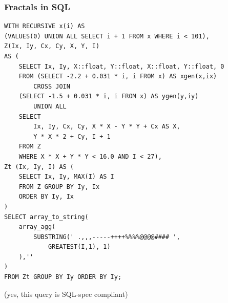 \documentclass{beamer}
\begin{document}
\begin{frame}[fragile]
    \frametitle{Fractals in SQL}
    \tiny
    \begin{verbatim}
WITH RECURSIVE x(i) AS
(VALUES(0) UNION ALL SELECT i + 1 FROM x WHERE i < 101),
Z(Ix, Iy, Cx, Cy, X, Y, I)
AS (
    SELECT Ix, Iy, X::float, Y::float, X::float, Y::float, 0
    FROM (SELECT -2.2 + 0.031 * i, i FROM x) AS xgen(x,ix)
        CROSS JOIN
    (SELECT -1.5 + 0.031 * i, i FROM x) AS ygen(y,iy)
        UNION ALL
    SELECT
        Ix, Iy, Cx, Cy, X * X - Y * Y + Cx AS X,
        Y * X * 2 + Cy, I + 1
    FROM Z
    WHERE X * X + Y * Y < 16.0 AND I < 27),
Zt (Ix, Iy, I) AS (
    SELECT Ix, Iy, MAX(I) AS I
    FROM Z GROUP BY Iy, Ix
    ORDER BY Iy, Ix
)
SELECT array_to_string(
    array_agg(
        SUBSTRING(' .,,,-----++++%%%%@@@@#### ',
            GREATEST(I,1), 1)
    ),''
)
FROM Zt GROUP BY Iy ORDER BY Iy;
    \end{verbatim}
    \normalsize
    (yes, this query is SQL-spec compliant)
\end{frame}

\begin{frame}
\end{frame}
\end{document}
